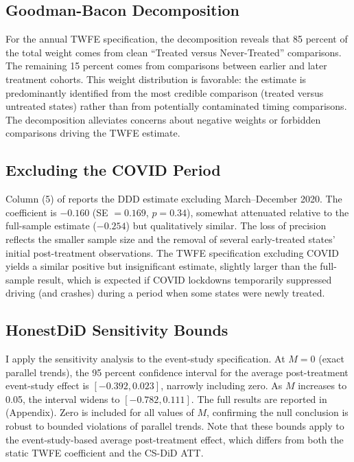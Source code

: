 \documentclass[12pt]{article}
\begin{document}
\subsection{Goodman-Bacon Decomposition}

For the annual TWFE specification, the \citet{goodmanbacon2021difference} decomposition reveals that 85 percent of the total weight comes from clean ``Treated versus Never-Treated'' comparisons. The remaining 15 percent comes from comparisons between earlier and later treatment cohorts. This weight distribution is favorable: the estimate is predominantly identified from the most credible comparison (treated versus untreated states) rather than from potentially contaminated timing comparisons. The decomposition alleviates concerns about negative weights or forbidden comparisons driving the TWFE estimate.

\subsection{Excluding the COVID Period}

Column (5) of  reports the DDD estimate excluding March--December 2020. The coefficient is $-0.160$ (SE $= 0.169$, $p = 0.34$), somewhat attenuated relative to the full-sample estimate ($-0.254$) but qualitatively similar. The loss of precision reflects the smaller sample size and the removal of several early-treated states' initial post-treatment observations. The TWFE specification excluding COVID yields a similar positive but insignificant estimate, slightly larger than the full-sample result, which is expected if COVID lockdowns temporarily suppressed driving (and crashes) during a period when some states were newly treated.

\subsection{HonestDiD Sensitivity Bounds}

I apply the \citet{rambachan2023more} sensitivity analysis to the event-study specification. At $M = 0$ (exact parallel trends), the 95 percent confidence interval for the average post-treatment event-study effect is $[-0.392, 0.023]$, narrowly including zero. As $M$ increases to 0.05, the interval widens to $[-0.782, 0.111]$. The full results are reported in  (Appendix). Zero is included for all values of $M$, confirming the null conclusion is robust to bounded violations of parallel trends. Note that these bounds apply to the event-study-based average post-treatment effect, which differs from both the static TWFE coefficient and the CS-DiD ATT.
\end{document}

